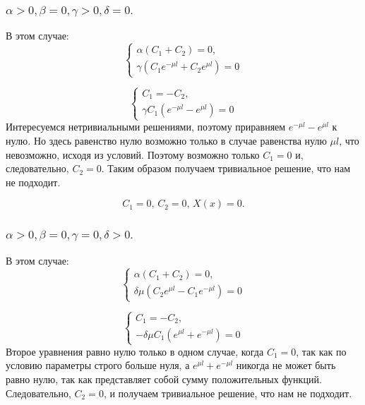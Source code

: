 \documentclass[12pt, a4paper]{report}
\begin{document}
\subsubsection{ $ \alpha > 0, \beta = 0, \gamma > 0, \delta = 0. $}
В этом случае:
\begin{displaymath}
	\begin{cases}
		\alpha (C_{1} + C_{2}) = 0, \\
		\gamma (C_{1} e^{-\mu l} + C_{2} e^{\mu l}) = 0
	\end{cases}
\end{displaymath}

\begin{displaymath}
	\begin{cases}
		C_{1} = - C_{2}, \\
		\gamma C_{1}(e^{-\mu l} - e^{\mu l}) = 0
	\end{cases}
\end{displaymath}
Интересуемся нетривиальными решениями, поэтому приравняем $e^{-\mu l} - e^{\mu l}$ к нулю. Но здесь равенство нулю возможно только в случае равенства нулю $\mu l$, что невозможно, исходя из условий. Поэтому возможно только $C_{1} = 0$ и, следовательно, $C_{2} = 0$. Таким образом получаем тривиальное решение, что нам не подходит.

\[ C_{1} = 0, \, C_{2} = 0, \, X(x) = 0. \]

\subsubsection{ $ \alpha > 0, \beta = 0, \gamma = 0, \delta > 0. $}
В этом случае:
\begin{displaymath}
	\begin{cases}
		\alpha (C_{1} + C_{2}) = 0, \\
		\delta \mu (C_{2} e^{\mu l} - C_{1} e^{-\mu l}) = 0
	\end{cases}
\end{displaymath}

\begin{displaymath}
	\begin{cases}
		C_{1} = - C_{2}, \\
		-\delta \mu C_{1} (e^{\mu l} + e^{-\mu l}) = 0
	\end{cases}
\end{displaymath}
Второе уравнения равно нулю только в одном случае, когда $C_{1} = 0$, так как по условию параметры строго больше нуля, а $e^{\mu l} + e^{-\mu l}$ никогда не может быть равно нулю, так как представляет собой сумму положительных функций. Следовательно, $C_{2} = 0$, и получаем тривиальное решение, что нам не подходит.
\end{document}
